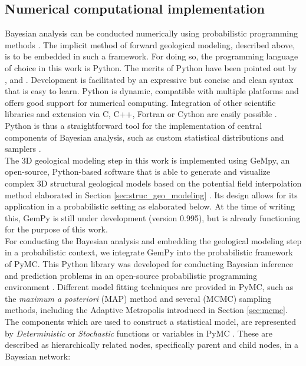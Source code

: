 		\subsection{Numerical computational implementation}\label{sec:numerical_implementation}
		Bayesian analysis can be conducted numerically using probabilistic programming methods \citep{salvatier2016pymc3}. The implicit method of forward geological modeling, described above, is to be embedded in such a framework. For doing so, the programming language of choice in this work is Python. The merits of Python have been pointed out by \citet{behnel2010}, \citet{Langtangen2008} and \citet{salvatier2016pymc3}. Development is facilitated by an expressive but concise and clean syntax that is easy to learn. Python is dynamic, compatible with multiple platforms and offers good support for numerical computing. Integration of other scientific libraries and extension via C, C++, Fortran or Cython are easily possible \citep{behnel2010, salvatier2016pymc3, Langtangen2008}. Python is thus a straightforward tool for the implementation of central components of Bayesian analysis, such as custom statistical distributions and samplers \citep{salvatier2016pymc3}.\\
		The 3D geological modeling step in this work is implemented using GeMpy, an open-source, Python-based software that is able to generate and visualize complex 3D structural geological models based on the potential field interpolation method elaborated in Section \ref{sec:struc_geo_modeling} \citep{delaVarga2017gempy}. Its design allows for its application in a probabilistic setting as elaborated below. At the time of writing this, GemPy is still under development (version 0.995), but is already functioning for the purpose of this work.\\
		For conducting the Bayesian analysis and embedding the geological modeling step in a probabilistic context, we integrate GemPy into the probabilistic framework of PyMC. This Python library was developed for conducting Bayesian inference and prediction problems in an open-source probabilistic programming environment \citep{davidson2015, salvatier2016pymc3}. Different model fitting techniques are provided in PyMC, such as the \textit{maximum a posteriori} (MAP) method and several (MCMC) sampling methods, including the Adaptive Metropolis introduced in Section \ref{sec:mcmc}. The components which are used to construct a statistical model, are represented by \textit{Deterministic} or \textit{Stochastic} functions or variables in PyMC \citep{salvatier2016pymc3}. These are described as hierarchically related nodes, specifically parent and child nodes, in a Bayesian network:
